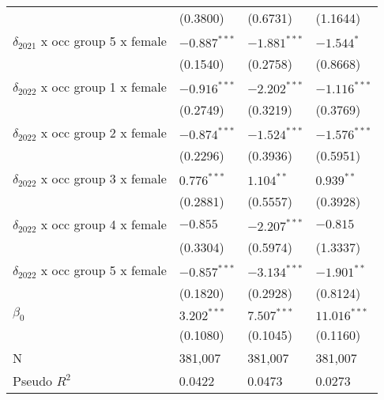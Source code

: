 \begin{tabular}{llll}
                                         &           (0.3800) &           (0.6731) &           (1.1644) \\
$\delta_{2021}$ x occ group 5 x female   &     $-0.887^{***}$ &     $-1.881^{***}$ &         $-1.544^*$ \\
                                         &           (0.1540) &           (0.2758) &           (0.8668) \\
$\delta_{2022}$ x occ group 1 x female   &     $-0.916^{***}$ &     $-2.202^{***}$ &     $-1.116^{***}$ \\
                                         &           (0.2749) &           (0.3219) &           (0.3769) \\
$\delta_{2022}$ x occ group 2 x female   &     $-0.874^{***}$ &     $-1.524^{***}$ &     $-1.576^{***}$ \\
                                         &           (0.2296) &           (0.3936) &           (0.5951) \\
$\delta_{2022}$ x occ group 3 x female   &      $0.776^{***}$ &       $1.104^{**}$ &       $0.939^{**}$ \\
                                         &           (0.2881) &           (0.5557) &           (0.3928) \\
$\delta_{2022}$ x occ group 4 x female   &           $-0.855$ &     $-2.207^{***}$ &           $-0.815$ \\
                                         &           (0.3304) &           (0.5974) &           (1.3337) \\
$\delta_{2022}$ x occ group 5 x female   &     $-0.857^{***}$ &     $-3.134^{***}$ &      $-1.901^{**}$ \\
                                         &           (0.1820) &           (0.2928) &           (0.8124) \\
$\beta_0$                                &      $3.202^{***}$ &      $7.507^{***}$ &     $11.016^{***}$ \\
                                         &           (0.1080) &           (0.1045) &           (0.1160) \\
N                                        &            381,007 &            381,007 &            381,007 \\
Pseudo $R^2$                             &             0.0422 &             0.0473 &             0.0273 \\
\bottomrule
\end{tabular}
